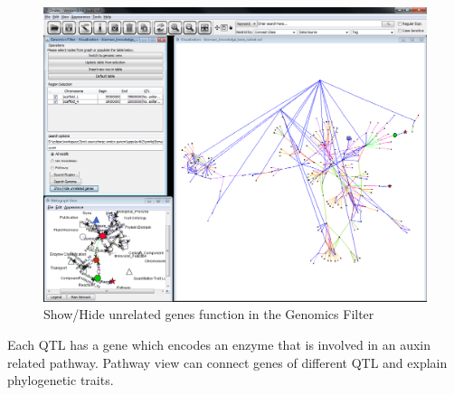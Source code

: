 \begin{figure}[H]
\centering
\includegraphics[scale=0.35]{images/Oct12/poplarkb_hide_unrelated_genes.png} 
\caption{Show/Hide unrelated genes function in the Genomics Filter}
\label{fig:poplarkb_hide_unrelated_genes}
\end{figure}

Each QTL has a gene which encodes an enzyme that is involved in an auxin related pathway.
Pathway view can connect genes of different QTL and explain phylogenetic traits.
